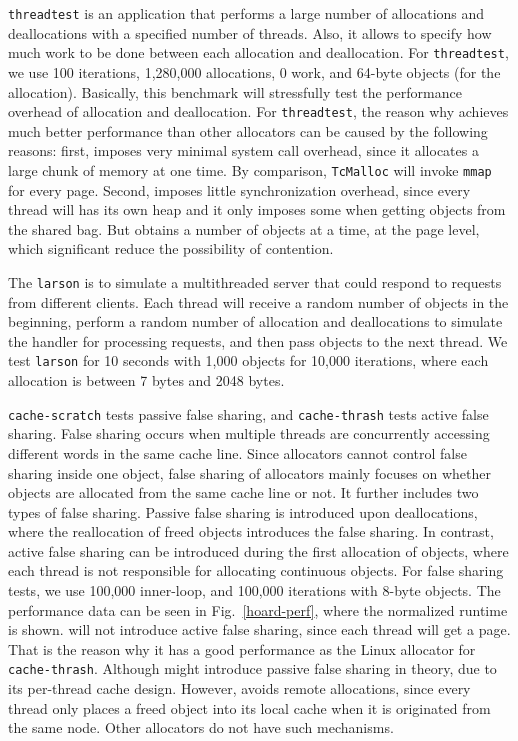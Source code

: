 \texttt{threadtest} is an application that performs a large number of allocations and deallocations with a specified number of threads. Also, it allows to specify how much work to be done between each allocation and deallocation. For \texttt{threadtest}, we use 100 iterations, 1,280,000 allocations, 0 work, and 64-byte objects (for the allocation).  Basically, this benchmark will stressfully test the performance overhead of allocation and deallocation. For \texttt{threadtest}, the reason why \NM{} achieves much better performance than other allocators can be caused by the following reasons: first, \NM{} imposes very minimal system call overhead, since it allocates a large chunk of memory at one time. By comparison, \texttt{TcMalloc} will invoke \texttt{mmap} for every page. Second, \NM{} imposes little synchronization overhead, since every thread will has its own heap and it only imposes some when getting objects from the shared bag. But \NM{} obtains a number of objects at a time, at the page level, which significant reduce the possibility of contention. 

The \texttt{larson} is to simulate a multithreaded server that could respond to requests from different clients. Each thread   will receive a random number of objects in the beginning, perform a random number of allocation and deallocations to simulate the handler for processing requests, and then pass objects to the next thread. We test \texttt{larson} for 10 seconds with 1,000 objects for 10,000 iterations, where each allocation is between 7 bytes and 2048 bytes. 


\texttt{cache-scratch} tests passive false sharing, and \texttt{cache-thrash} tests active false sharing. False sharing occurs when multiple threads are concurrently accessing different words in the same cache line. Since allocators cannot control false sharing inside one object, false sharing of allocators mainly focuses on whether objects are allocated from the same cache line or not. It further includes two types of false sharing.   Passive false sharing is introduced upon deallocations, where the reallocation of freed objects introduces the false sharing. In contrast, active false sharing can be introduced during the first allocation of objects, where each thread is not responsible for allocating continuous objects.   For false sharing tests, we use 100,000 inner-loop, and 100,000 iterations with 8-byte objects. The performance data can be seen in Fig.~\ref{hoard-perf}, where the normalized runtime is shown. \NM{} will not introduce active false sharing, since each thread will get a page. That is the reason why it has a good performance as the Linux allocator for \texttt{cache-thrash}. Although \NM{} might introduce passive false sharing in theory, due to its per-thread cache design. However, \NM{} avoids remote allocations, since every thread only places a freed object into its local cache when it is originated from the same node.  Other allocators do not have such mechanisms.   


